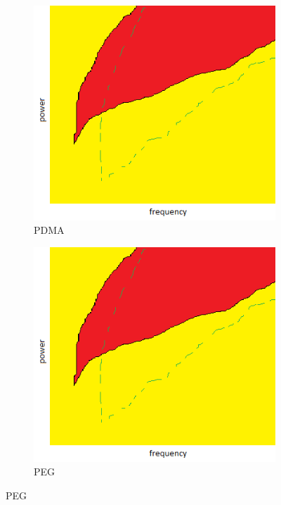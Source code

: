 \begin{figure}
	\centering
  \begin{subfigure}[b]{0.4\textwidth}
		\includegraphics[width=\textwidth]{figures/hysteresis_regime_coated.png}
		\caption{PDMA}
		\label{fig:rPDMA}
  \end{subfigure}
	  \begin{subfigure}[b]{0.4\textwidth}
		\includegraphics[width=\textwidth]{figures/hysteresis_regime_coated.png}
		\caption{PEG}
		\label{fig:rPEG}
  \end{subfigure}
		

\end{figure}

